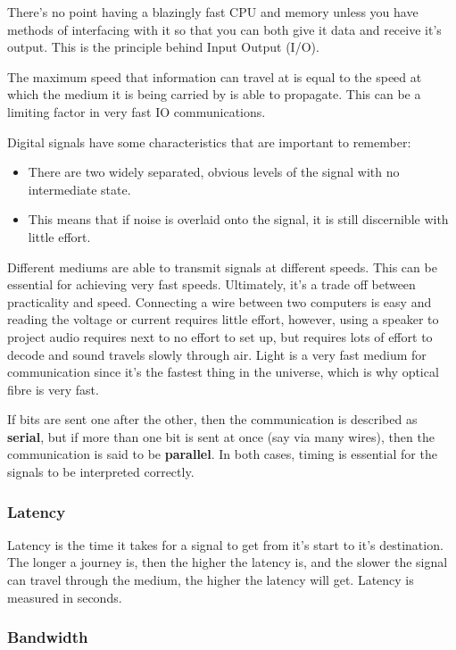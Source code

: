 There's no point having a blazingly fast CPU and memory unless you have methods
of interfacing with it so that you can both give it data and receive it's
output. This is the principle behind Input Output (I/O).

The maximum speed that information can travel at is equal to the speed at which
the medium it is being carried by is able to propagate. This can be a limiting
factor in very fast IO communications.

Digital signals have some characteristics that are important to remember:

\begin{itemize}
	\item There are two widely separated, obvious levels of the signal with no
	intermediate state.
	\item This means that if noise is overlaid onto the signal, it is still
	discernible with little effort.
\end{itemize}

Different mediums are able to transmit signals at different speeds. This can be
essential for achieving very fast speeds. Ultimately, it's a trade off between
practicality and speed. Connecting a wire between two computers is easy and
reading the voltage or current requires little effort, however, using a speaker
to project audio requires next to no effort to set up, but requires lots of
effort to decode and sound travels slowly through air. Light is a very fast
medium for communication since it's the fastest thing in the universe, which is
why optical fibre is very fast.

If bits are sent one after the other, then the communication is described as
{\bf serial}, but if more than one bit is sent at once (say via many wires),
then the communication is said to be {\bf parallel}. In both cases, timing is
essential for the signals to be interpreted correctly.

\subsubsection{Latency}

Latency is the time it takes for a signal to get from it's start to it's
destination. The longer a journey is, then the higher the latency is, and the
slower the signal can travel through the medium, the higher the latency will
get. Latency is measured in seconds.

\subsubsection{Bandwidth}


